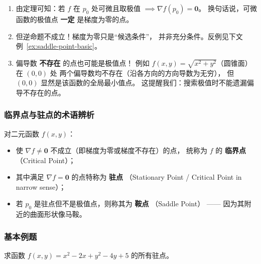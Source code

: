 \documentclass[lang=cn,11pt]{elegantbook}
\begin{document}
\begin{remark} \label{remark:necessary-critical-point}
\begin{enumerate}
  \item[\textbf{(1)}] 由定理可知：若 $f$ 在 $p_0$ 处可微且取极值 $\implies \nabla f(p_0)=\boldsymbol 0$。
        换句话说，可微函数的极值点 \textbf{一定} 是梯度为零的点。

  \item[\textbf{(2)}] 但逆命题不成立！梯度为零只是“候选条件”，
        并非充分条件。反例见下文例~\ref{ex:saddle-point-basic}。

  \item[\textbf{(3)}] 偏导数 \textbf{不存在} 的点也可能是极值点！
        例如 $f(x,y)=\sqrt{x^2+y^2}$（圆锥面）在 $(0,0)$ 处
        两个偏导数均不存在（沿各方向的方向导数为无穷），
        但 $(0,0)$ 显然是该函数的全局最小值点。
        这提醒我们：搜索极值时不能遗漏偏导不存在的点。
\end{enumerate}
\end{remark}

\subsubsection*{临界点与驻点的术语辨析}

\begin{definition}[临界点与驻点] \label{def:critical-stationary-saddle}
对二元函数 $f(x,y)$：
\begin{itemize}
  \item 使 $\nabla f \neq \boldsymbol 0$ 不成立（即梯度为零或梯度不存在）的点，
        统称为 $f$ 的 \textbf{临界点}（Critical Point）；

  \item 其中满足 $\nabla f=\boldsymbol 0$ 的点特称为 \textbf{驻点}
        （Stationary Point / Critical Point in narrow sense）；

  \item 若 $p_0$ 是驻点但不是极值点，则称其为 \textbf{鞍点}
        （Saddle Point） —— 因为其附近的曲面形状像马鞍。
\end{itemize}
\end{definition}


\subsubsection*{基本例题}

\begin{example} \label{ex:extreme-basic}
求函数
$f(x,y)=x^2-2x+y^2-4y+5$
的所有驻点。
\end{example}
\end{document}
